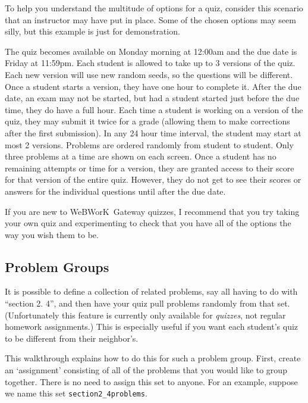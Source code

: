\documentclass[12pt]{article}
\newcommand{\WW}{WeBWorK}
\begin{document}
To help you understand the multitude of options for a quiz, consider this scenario that an instructor may have put in place.
Some of the chosen options may seem silly, but this example is just for demonstration.

\hfill\begin{minipage}{0.9\textwidth}
	The quiz becomes available on Monday morning at 12:00{\sc am} and the due date is Friday at 11:59{\sc pm}.
	Each student is allowed to take up to 3 versions of the quiz.
	Each new version will use new random seeds, so the questions will be different.
	Once a student starts a version, they have one hour to complete it.
	After the due date, an exam may not be started, but had a student started just before the due time, they do have a full hour.
	Each time a student is working on a version of the quiz, they may submit it twice for a grade (allowing them to make corrections after the first submission).
	In any 24 hour time interval, the student may start at most 2 versions.
	Problems are ordered randomly from student to student.
	Only three problems at a time are shown on each screen.
	Once a student has no remaining attempts or time for a version, they are granted access to their score for that version of the entire quiz.
	However, they do not get to see their scores or answers for the individual questions until after the due date.
\end{minipage}

If you are new to \WW\ Gateway quizzes, I recommend that you try taking your own quiz and experimenting to check that you have all of the options the way you wish them to be.

\subsection{Problem Groups}\label{groups}

It is possible to define a collection of related problems, say all having to do with ``section 2.
4'', and then have your quiz pull problems randomly from that set. (Unfortunately this feature is currently only available for \emph{quizzes}, not regular homework assignments.) This is especially useful if you want each student's quiz to be different from their neighbor's.

This walkthrough explains how to do this for such a problem group.
First, create an `assignment' consisting of all of the problems that you would like to group together.
There is no need to assign this set to anyone.
For an example, suppose we name this set \texttt{section2\_4problems}.
\end{document}
